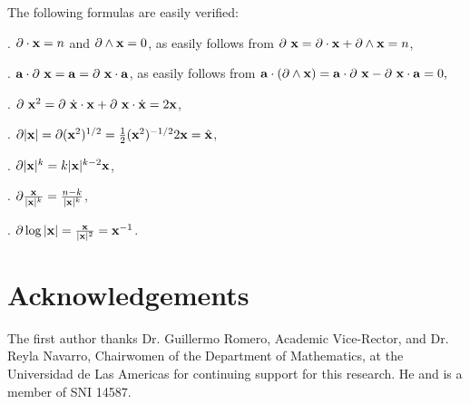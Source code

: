 \documentclass[12]{article}
\def\no{\noindent}
\def\bx{{\bf x}}
\def\ba{{\bf a}}
\def\w{\wedge}
\def\no{\noindent}
\def\no{\noindent}
\def\no{\noindent}
\begin{document}
     The following formulas are easily verified:
     
     \bigskip
     
     \no 1. $ \partial \cdot \bx = n$ and $\partial \w \bx =0$, as easily follows from 
     $\partial \ \bx = \partial \cdot \bx + \partial \w \bx = n$,          
     
     \bigskip
     
     \no 2. $\ba \cdot \partial  \ \bx = \ba = \partial \ \bx\cdot \ba$, as easily follows from 
        $\ba\cdot (\partial \w \bx) =\ba\cdot \partial \ \bx - \partial \ \bx\cdot \ba =0, $
      
        \bigskip  
               
     \no 3. $\partial \ \bx^2 = \partial \ \dot \bx\cdot \bx +\partial \ \bx\cdot \dot \bx = 2\bx$,
     
     \bigskip
     
     \no 4. $\partial |\bx|= \partial (\bx^2)^{1/2} =\frac{1}{2}(\bx^2)^{-1/2}2 \bx = \hat \bx$,
     
     \bigskip
     
     \no 5. $\partial |\bx|^k = k|\bx|^{k-2}\bx$,
     
     \bigskip
     
     \no 6. $\partial \frac{\bx}{|\bx|^k}=\frac{n-k}{|\bx|^k}$,
     
     \bigskip
     
     \no 7. $\partial \log |\bx|= \frac{\bx}{|\bx|^2}=\bx^{-1}$.   
   
   
 \section*{Acknowledgements} 
 
     The first author thanks Dr. Guillermo Romero, Academic Vice-Rector, and Dr. Reyla Navarro, Chairwomen of
   the Department of Mathematics, at the Universidad de Las Americas for continuing 
   support for this research. He and is a member of SNI 14587.   
    
\end{document}

